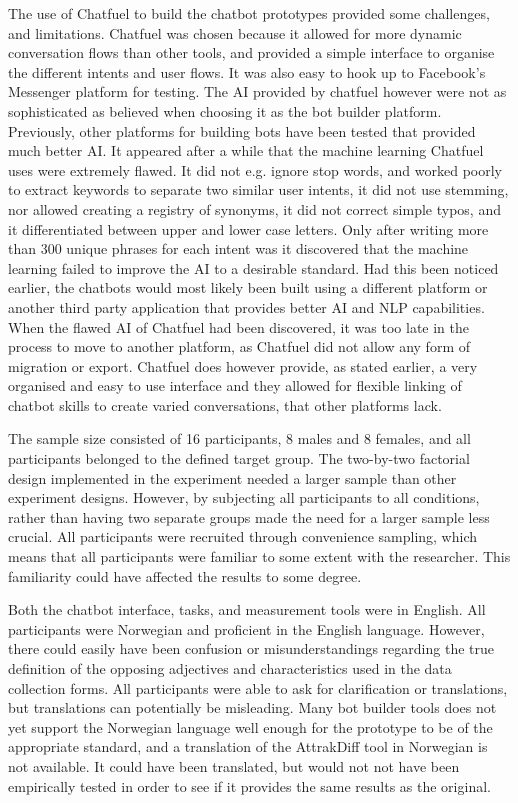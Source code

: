 The use of Chatfuel to build the chatbot prototypes provided some challenges, and limitations. Chatfuel was chosen because it allowed for more dynamic conversation flows than other tools, and provided a simple interface to organise the different intents and user flows. It was also easy to hook up to Facebook's Messenger platform for testing. The AI provided by chatfuel however were not as sophisticated as believed when choosing it as the bot builder platform. Previously, other platforms for building bots have been tested that provided much better AI. It appeared after a while that the machine learning Chatfuel uses were extremely flawed. It did not e.g. ignore stop words, and worked poorly to extract keywords to separate two similar user intents, it did not use stemming, nor allowed creating a registry of synonyms, it did not correct simple typos, and it differentiated between upper and lower case letters. Only after writing more than 300 unique phrases for each intent was it discovered that the machine learning failed to improve the AI to a desirable standard. Had this been noticed earlier, the chatbots would most likely been built using a different platform or another third party application that provides better AI and NLP capabilities. When the flawed AI of Chatfuel had been discovered, it was too late in the process to move to another platform, as Chatfuel did not allow any form of migration or export. Chatfuel does however provide, as stated earlier, a very organised and easy to use interface and they allowed for flexible linking of chatbot skills to create varied conversations, that other platforms lack. 

The sample size consisted of 16 participants, 8 males and 8 females, and all participants belonged to the defined target group. The two-by-two factorial design implemented in the experiment needed a larger sample than other experiment designs. However, by subjecting all participants to all conditions, rather than having two separate groups made the need for a larger sample less crucial. All participants were recruited through convenience sampling, which means that all participants were familiar to some extent with the researcher. This familiarity could have affected the results to some degree.

Both the chatbot interface, tasks, and measurement tools were in English. All participants were Norwegian and proficient in the English language. However, there could easily have been confusion or misunderstandings regarding the true definition of the opposing adjectives and characteristics used in the data collection forms. All participants were able to ask for clarification or translations, but translations can potentially be misleading. Many bot builder tools does not yet support the Norwegian language well enough for the prototype to be of the appropriate standard, and a translation of the AttrakDiff tool in Norwegian is not available. It could have been translated, but would not not have been empirically tested in order to see if it provides the same results as the original.